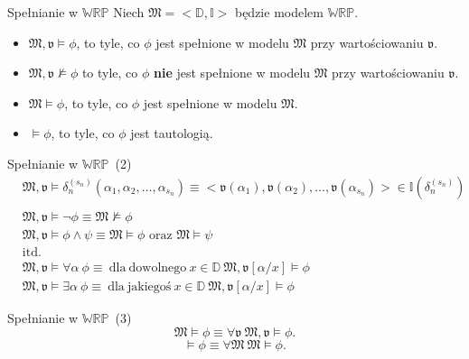 \documentclass{beamer}
\newcommand {\WRP} {\ensuremath{\mathbb{WRP}}}
\begin{document}
\begin{frame}{Spełnianie w \WRP}
%
Niech $\mathfrak{M}=<\mathbb{D}, \mathbb{I}>$ będzie modelem \WRP.\\
%
\begin{itemize}
\item $\mathfrak{M},\mathfrak{v} \vDash \phi$, to tyle, co $\phi$ jest spełnione w modelu $\mathfrak{M}$ przy wartościowaniu $\mathfrak{v}$.
%
\item $\mathfrak{M},\mathfrak{v}  \nvDash \phi$ to tyle, co $\phi$ \textbf{nie} jest spełnione w modelu $\mathfrak{M}$ przy wartościowaniu $\mathfrak{v}$.
%
\item $\mathfrak{M} \vDash \phi$, to tyle, co $\phi$ jest spełnione w modelu $\mathfrak{M}$.
%
\item $\vDash \phi$, to tyle, co $\phi$ jest tautologią.
\end{itemize}
\end{frame}


\begin{frame}{Spełnianie w \WRP~(2)}
%
\begin{eqnarray}
\label{sat-2}
& \mathfrak{M},\mathfrak{v} \vDash \delta_n^{(s_{n})}(\alpha_{1}, \alpha_{2}, \dots, \alpha_{s_{n}}) \equiv <\mathfrak{v}(\alpha_{1}), \mathfrak{v}(\alpha_{2}), \dots, \mathfrak{v}(\alpha_{s_{n}})> \in \mathbb{I}(\delta_n^{(s_{n})})\nonumber \\ \\
%
& \mathfrak{M},\mathfrak{v} \vDash \neg \phi \equiv \mathfrak{M} \nvDash \phi \\
%
& \mathfrak{M},\mathfrak{v} \vDash \phi \land \psi \equiv \mathfrak{M} \vDash \phi \textrm{~oraz~}  \mathfrak{M} \vDash \psi\\
%
& \mathrm{itd.}\nonumber \\
%
& \mathfrak{M},\mathfrak{v} \vDash \forall \alpha ~ \phi \equiv \mathrm{~dla~ dowolnego~} x \in \mathbb{D}~\mathfrak{M},\mathfrak{v}[\alpha/x] \vDash \phi\\
%
& \mathfrak{M},\mathfrak{v} \vDash \exists \alpha ~ \phi \equiv \mathrm{~dla~ jakiegoś~} x \in \mathbb{D}~\mathfrak{M},\mathfrak{v}[\alpha/x] \vDash \phi
\end{eqnarray}
\end{frame}

\begin{frame}{Spełnianie w \WRP~(3)}
%
\begin{equation}
\mathfrak{M} \vDash \phi \equiv \forall \mathfrak{v}~\mathfrak{M},\mathfrak{v} \vDash \phi.
\end{equation}
%
\begin{equation}
\vDash \phi \equiv \forall \mathfrak{M}~ \mathfrak{M}\vDash \phi.
\end{equation}
\end{frame}
\end{document}
